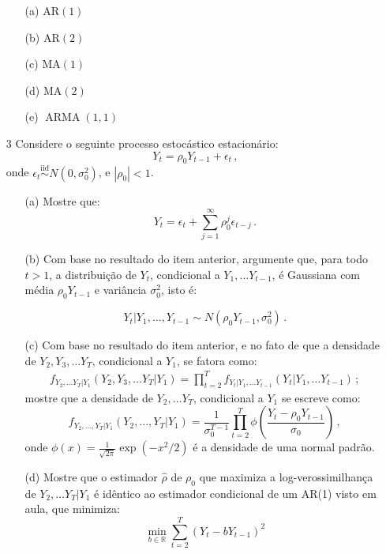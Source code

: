 \documentclass[10pt,a4paper]{article}
\begin{document}
\begin{enumerate}
		\begin{itemize}
			
			\item[(a)] $\mathrm{AR}(1)$
			
			\item[(b)] $\mathrm{AR}(2)$
			
			\item[(c)] $\mathrm{MA}(1)$
			
			\item[(d)] $\mathrm{MA}(2)$
			
			\item[(e)] $\operatorname{ARMA}(1,1)$
		\end{itemize}
		
		\item[3] Considere o seguinte processo estocástico estacionário:
		$$Y_t = \rho_0 Y_{t-1} + \epsilon_t\, ,$$
		onde $\epsilon_t \overset{\text{iid}}{\sim} N(0,\sigma^2_0)$, e $|\rho_0| < 1$.
		
		\begin{enumerate}
			\item[(a)] Mostre que:
			$$Y_t = \epsilon_t + \sum_{j=1}^\infty \rho^j_0 \epsilon_{t-j} \, .$$
			\item[(b)] Com base no resultado do item anterior, argumente que, para todo $t > 1$, a distribuição de $Y_t$, condicional a $Y_1, \ldots Y_{t-1}$, é Gaussiana com média $\rho_0 Y_{t-1}$ e variância $\sigma^2_0$, isto é:
			
			$$Y_t|Y_1,\ldots, Y_{t-1} \sim N(\rho_0 Y_{t-1}, \sigma^2_0)\, .$$
			\item[(c)] Com base no resultado do item anterior, e no fato de que a densidade de $Y_{2}, Y_{3},\ldots Y_{T}$, condicional a $Y_{1}$, se fatora como:
			\begin{equation*}
				\begin{aligned}	
					f_{ Y_{2},\ldots Y_{T}|Y_1}(Y_{2},Y_{3},\ldots Y_{T}|Y_1) =  \prod_{t=2}^T f_{Y_{t}|Y_1,\ldots Y_{t-1}}(Y_{t}|Y_1,\ldots Y_{t-1})  \, ;
				\end{aligned} 
			\end{equation*}
			mostre que a densidade de $Y_2,\ldots Y_T$, condicional a $Y_1$ se escreve como:
			$$f_{Y_2,\ldots, Y_T|Y_1}(Y_2,\ldots, Y_T|Y_1) = \frac{1}{\sigma^{T-1}_0}\prod_{t=2}^T\phi\left(\frac{Y_t - \rho_0 Y_{t-1}}{\sigma_0}\right)\, ,$$
			onde $\phi(x) = \frac{1}{\sqrt{2\pi}}\exp(-x^2/2)$ é a densidade de uma normal padrão.
			\item[(d)]	Mostre que o estimador $\hat{\rho}$ de $\rho_0$ que maximiza a log-verossimilhança de $Y_2,\ldots Y_T|Y_1$ é idêntico ao estimador condicional de um AR(1) visto em aula, que minimiza:	
			$$\min_{b \in \mathbb{R}}\sum_{t=2}^T (Y_t - b Y_{t-1})^2$$
		\end{enumerate}
	\end{enumerate}
	
\end{document}
